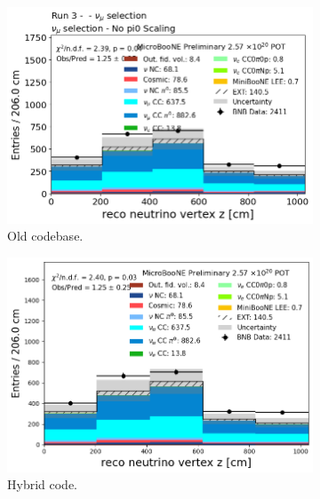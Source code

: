 \begin{figure}[H]
    \centering
    \begin{subfigure}[t]{0.32\linewidth}
        \includegraphics[width=\linewidth]{technote/Appendix_Validation/Figures/Numu/Run3_Vertex_Z_Old.png}
        \caption{Old codebase.}
    \end{subfigure}%
    \hspace{0.2cm}%
    \begin{subfigure}[t]{0.32\linewidth}
        \includegraphics[width=\linewidth]{technote/Appendix_Validation/Figures/Numu/Run3_Vertex_Z_Chris.png}
        \caption{Hybrid code.}
    \end{subfigure}%
    \hspace{0.2cm}%
    \begin{subfigure}[t]{0.32\linewidth}

\end{subfigure}
\end{figure}
